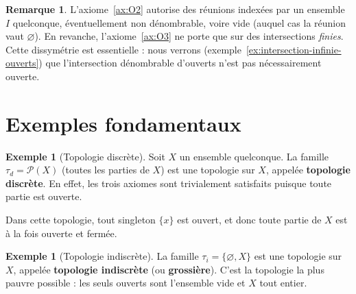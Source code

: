 \documentclass[12pt,a4paper,openany]{book}
\theoremstyle{definition}
\theoremstyle{cours}
\theoremstyle{coursnormal}
\newtheorem{remarque}[theoreme]{Remarque}
\newtheorem{exemple}[theoreme]{Exemple}
\begin{document}
\begin{remarque}
  L'axiome~\ref{ax:O2} autorise des réunions indexées par un ensemble $I$ quelconque, éventuellement non dénombrable, voire vide (auquel cas la réunion vaut $\varnothing$). En revanche, l'axiome~\ref{ax:O3} ne porte que sur des intersections \emph{finies}. Cette dissymétrie est essentielle : nous verrons (exemple~\ref{ex:intersection-infinie-ouverts}) que l'intersection dénombrable d'ouverts n'est pas nécessairement ouverte.
\end{remarque}

\section{Exemples fondamentaux}
\label{sec:exemples-topologies}

\begin{exemple}[Topologie discrète]\label{ex:topo-discrete}
  Soit $X$ un ensemble quelconque. La famille $\tau_d = \mathcal{P}(X)$ (toutes les parties de $X$) est une topologie sur $X$, appelée \textbf{topologie discrète}. En effet, les trois axiomes sont trivialement satisfaits puisque toute partie est ouverte.

  Dans cette topologie, tout singleton $\{x\}$ est ouvert, et donc toute partie de $X$ est à la fois ouverte et fermée.
\end{exemple}

\begin{exemple}[Topologie indiscrète]\label{ex:topo-indiscrete}
  La famille $\tau_i = \{\varnothing, X\}$ est une topologie sur $X$, appelée \textbf{topologie indiscrète} (ou \textbf{grossière}). C'est la topologie la plus pauvre possible : les seuls ouverts sont l'ensemble vide et $X$ tout entier.
\end{exemple}
\end{document}
